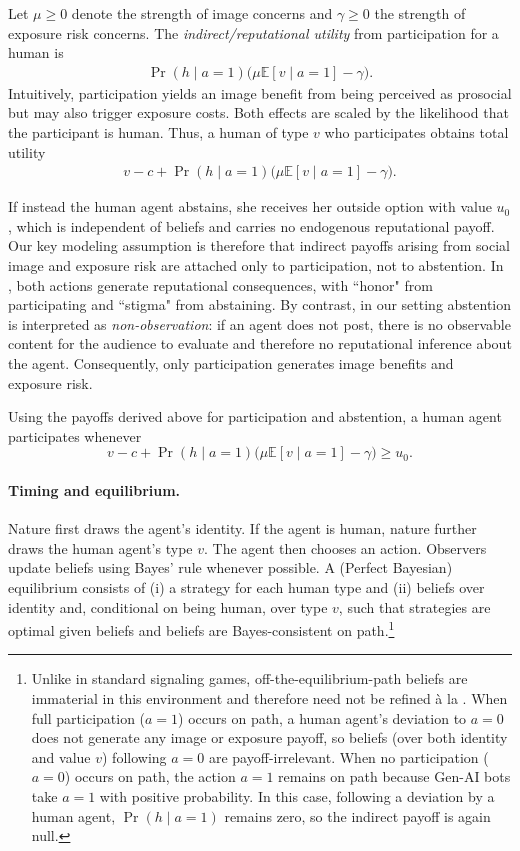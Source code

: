 \documentclass[12pt,notitlepage]{article}
\theoremstyle{plain}
\theoremstyle{plain}
\theoremstyle{definition}
\theoremstyle{definition}
\theoremstyle{assumption}
\theoremstyle{plain}
\theoremstyle{plain}
\theoremstyle{plain}
\theoremstyle{plain}
\theoremstyle{definition}%
\theoremstyle{plain}
\theoremstyle{plain}
\theoremstyle{plain}
\theoremstyle{plain}
\DeclareMathOperator{\prob}{Pr}
\begin{document}
Let $\mu\ge 0$ denote the strength of image concerns and $\gamma\ge 0$ the strength of exposure risk concerns. The \textit{indirect/reputational utility} from participation for a human is
\begin{align*}
    \prob(h\mid a=1)\big(\mu \mathbb{E}[v\mid a=1] - \gamma\big).
\end{align*}
Intuitively, participation yields an image benefit from being perceived as prosocial but may also trigger exposure costs. Both effects are scaled by the likelihood that the participant is human. Thus, a human of type $v$ who participates obtains total utility
\begin{align*}
    v-c+\prob(h\mid a=1)\big(\mu \mathbb{E}[v\mid a=1] - \gamma\big).
\end{align*}

If instead the human agent abstains, she receives her outside option with value $u_0$, which is independent of beliefs and carries no endogenous reputational payoff. Our key modeling assumption is therefore that indirect payoffs arising from social image and exposure risk are attached only to participation, not to abstention. In \cite{BenabouTirole:06}, both actions generate reputational consequences, with ``honor" from participating and ``stigma" from abstaining. By contrast, in our setting abstention is interpreted as \emph{non-observation}: if an agent does not post, there is no observable content for the audience to evaluate and therefore no reputational inference about the agent. Consequently, only participation generates image benefits and exposure risk.

Using the payoffs derived above for participation and abstention, a human agent participates whenever
\[
v-c+\prob(h\mid a=1)\big(\mu \mathbb{E}[v\mid a=1] - \gamma\big)\geq u_0.
\]


\paragraph{Timing and equilibrium.} Nature first draws the agent's identity. If the agent is human, nature further draws the human agent's type $v$. The agent then chooses an action. Observers update beliefs using Bayes' rule whenever possible. A (Perfect Bayesian) equilibrium consists of (i) a strategy for each human type and (ii) beliefs over identity and, conditional on being human, over type $v$, such that strategies are optimal given beliefs and beliefs are Bayes-consistent on path.\footnote{Unlike in standard signaling games, off-the-equilibrium-path beliefs are immaterial in this environment and therefore need not be refined \`a la \cite{ChoKreps:87}. When full participation ($a=1$) occurs on path, a human agent's deviation to $a=0$ does not generate any image or exposure payoff, so beliefs (over both identity and value $v$) following $a=0$ are payoff-irrelevant. When no participation ($a=0$) occurs on path, the action $a=1$ remains on path because Gen-AI bots take $a=1$ with positive probability. In this case, following a deviation by a human agent, $\prob(h\mid a=1)$ remains zero, so the indirect payoff is again null.}
\end{document}
